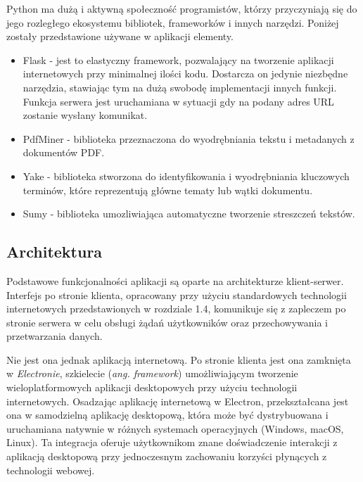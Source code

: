 \documentclass[12pt,a4paper,twoside]{article}
\begin{document}
Python ma dużą i aktywną społeczność programistów, którzy przyczyniają się do jego rozległego ekosystemu bibliotek, frameworków i innych narzędzi. Poniżej zostały przedstawione używane w aplikacji elementy.
\begin{itemize}
	\item Flask - jest to elastyczny framework, pozwalający na tworzenie aplikacji internetowych przy minimalnej ilości kodu. Dostarcza on jedynie niezbędne narzędzia, stawiając tym na dużą swobodę implementacji innych funkcji. Funkcja serwera jest uruchamiana w sytuacji gdy na podany adres URL zostanie wysłany komunikat.
	\item PdfMiner - biblioteka przeznaczona do wyodrębniania tekstu i metadanych z dokumentów PDF. 
	\item Yake - biblioteka stworzona do identyfikowania i wyodrębniania kluczowych terminów, które reprezentują główne tematy lub wątki dokumentu.
	\item Sumy - biblioteka umozliwiająca automatyczne tworzenie streszczeń tekstów.
\end{itemize}
\subsection{Architektura}
Podstawowe funkcjonalności aplikacji są oparte na architekturze klient-serwer. Interfejs po stronie klienta, opracowany przy użyciu standardowych technologii internetowych przedstawionych w rozdziale 1.4, komunikuje się z zapleczem po stronie serwera w celu obsługi żądań użytkowników oraz przechowywania i przetwarzania danych.\par
Nie jest ona jednak aplikacją internetową. Po stronie klienta jest ona zamknięta w \textit{Electronie}, szkielecie (\textit{ang. framework}) umożliwiającym tworzenie wieloplatformowych aplikacji desktopowych przy użyciu technologii internetowych. Osadzając aplikację internetową w Electron, przekształcana jest ona w samodzielną aplikację desktopową, która może być dystrybuowana i uruchamiana natywnie w różnych systemach operacyjnych (Windows, macOS, Linux). Ta integracja oferuje użytkownikom znane doświadczenie interakcji z aplikacją desktopową przy jednoczesnym zachowaniu korzyści płynących z technologii webowej.
\end{document}
